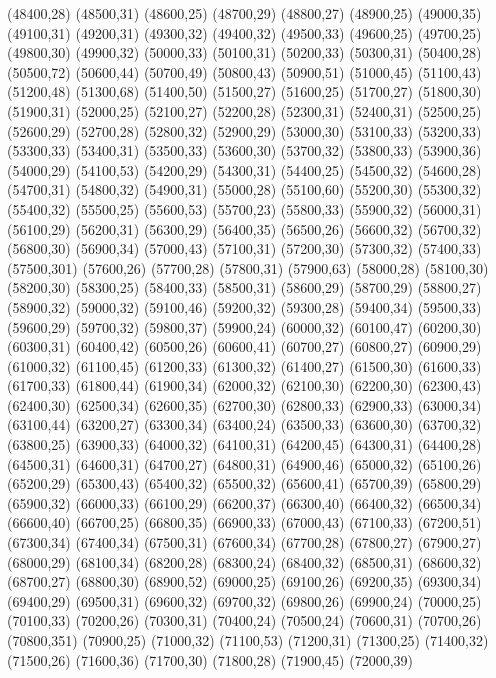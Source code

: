(48400,28)
(48500,31)
(48600,25)
(48700,29)
(48800,27)
(48900,25)
(49000,35)
(49100,31)
(49200,31)
(49300,32)
(49400,32)
(49500,33)
(49600,25)
(49700,25)
(49800,30)
(49900,32)
(50000,33)
(50100,31)
(50200,33)
(50300,31)
(50400,28)
(50500,72)
(50600,44)
(50700,49)
(50800,43)
(50900,51)
(51000,45)
(51100,43)
(51200,48)
(51300,68)
(51400,50)
(51500,27)
(51600,25)
(51700,27)
(51800,30)
(51900,31)
(52000,25)
(52100,27)
(52200,28)
(52300,31)
(52400,31)
(52500,25)
(52600,29)
(52700,28)
(52800,32)
(52900,29)
(53000,30)
(53100,33)
(53200,33)
(53300,33)
(53400,31)
(53500,33)
(53600,30)
(53700,32)
(53800,33)
(53900,36)
(54000,29)
(54100,53)
(54200,29)
(54300,31)
(54400,25)
(54500,32)
(54600,28)
(54700,31)
(54800,32)
(54900,31)
(55000,28)
(55100,60)
(55200,30)
(55300,32)
(55400,32)
(55500,25)
(55600,53)
(55700,23)
(55800,33)
(55900,32)
(56000,31)
(56100,29)
(56200,31)
(56300,29)
(56400,35)
(56500,26)
(56600,32)
(56700,32)
(56800,30)
(56900,34)
(57000,43)
(57100,31)
(57200,30)
(57300,32)
(57400,33)
(57500,301)
(57600,26)
(57700,28)
(57800,31)
(57900,63)
(58000,28)
(58100,30)
(58200,30)
(58300,25)
(58400,33)
(58500,31)
(58600,29)
(58700,29)
(58800,27)
(58900,32)
(59000,32)
(59100,46)
(59200,32)
(59300,28)
(59400,34)
(59500,33)
(59600,29)
(59700,32)
(59800,37)
(59900,24)
(60000,32)
(60100,47)
(60200,30)
(60300,31)
(60400,42)
(60500,26)
(60600,41)
(60700,27)
(60800,27)
(60900,29)
(61000,32)
(61100,45)
(61200,33)
(61300,32)
(61400,27)
(61500,30)
(61600,33)
(61700,33)
(61800,44)
(61900,34)
(62000,32)
(62100,30)
(62200,30)
(62300,43)
(62400,30)
(62500,34)
(62600,35)
(62700,30)
(62800,33)
(62900,33)
(63000,34)
(63100,44)
(63200,27)
(63300,34)
(63400,24)
(63500,33)
(63600,30)
(63700,32)
(63800,25)
(63900,33)
(64000,32)
(64100,31)
(64200,45)
(64300,31)
(64400,28)
(64500,31)
(64600,31)
(64700,27)
(64800,31)
(64900,46)
(65000,32)
(65100,26)
(65200,29)
(65300,43)
(65400,32)
(65500,32)
(65600,41)
(65700,39)
(65800,29)
(65900,32)
(66000,33)
(66100,29)
(66200,37)
(66300,40)
(66400,32)
(66500,34)
(66600,40)
(66700,25)
(66800,35)
(66900,33)
(67000,43)
(67100,33)
(67200,51)
(67300,34)
(67400,34)
(67500,31)
(67600,34)
(67700,28)
(67800,27)
(67900,27)
(68000,29)
(68100,34)
(68200,28)
(68300,24)
(68400,32)
(68500,31)
(68600,32)
(68700,27)
(68800,30)
(68900,52)
(69000,25)
(69100,26)
(69200,35)
(69300,34)
(69400,29)
(69500,31)
(69600,32)
(69700,32)
(69800,26)
(69900,24)
(70000,25)
(70100,33)
(70200,26)
(70300,31)
(70400,24)
(70500,24)
(70600,31)
(70700,26)
(70800,351)
(70900,25)
(71000,32)
(71100,53)
(71200,31)
(71300,25)
(71400,32)
(71500,26)
(71600,36)
(71700,30)
(71800,28)
(71900,45)
(72000,39)
